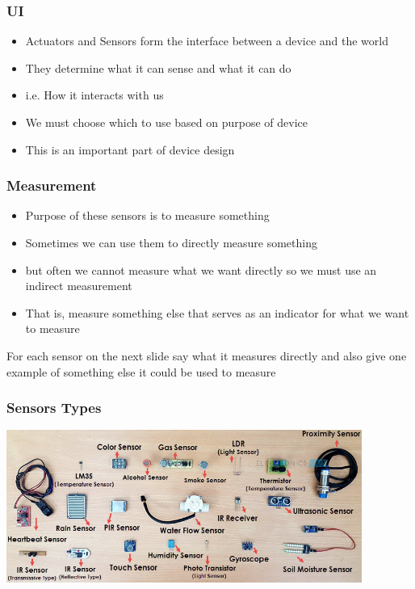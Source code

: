 \documentclass{beamer}
\begin{document}
  \begin{frame}
  	\frametitle{UI}
\begin{itemize}
	\item 	Actuators and Sensors form the interface between a device and the world
	\item They determine what it can sense and what it can do
	\item i.e. How it interacts with us
	\item We must choose which to use based on purpose of device  
	\item This is an important part of device design
\end{itemize}	
  \end{frame}
  
  \begin{frame}
  	\frametitle{Measurement}
  	\begin{itemize}
  		\item 	Purpose of these sensors is to measure something
  		\item   Sometimes we can use them to directly measure something
  		\item but often we cannot measure what we want directly so we must use an indirect measurement
  		\item That is, measure something else that serves as an indicator for what we want to measure
  	\end{itemize}	
  	For each sensor on the next slide say what it measures directly and also give one example of something else it could be used to measure
  \end{frame}  
  
    \begin{frame}
    	\frametitle{Sensors Types}

    	\includegraphics[height=5cm]{Types-of-Sensors.jpg}
    	
    \end{frame}
    
\end{document}
